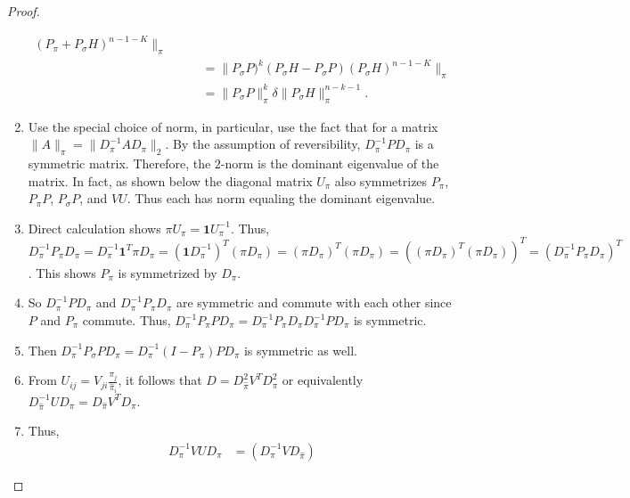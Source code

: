 \documentclass[12pt]{article}
\begin{document}
\begin{proof}
\begin{enumerate}
\begin{align*}
                (P_{\pi}+P_{\sigma}H)^{n-1-K}\|_{\pi} \\
                & \qquad = \|P_{\sigma}P)^k(P_{\sigma}H-P_{\sigma}P) (P_
                {\sigma}H)^{n-1-K}\|_{\pi} \\
                & \qquad = \| P_{\sigma} P \|_{\pi}^k \delta \|P_{\sigma}H\|_
                {\pi}^{n-k-1}.
            \end{align*}
        \item
            Use the special choice of norm, in particular, use the fact
            that for a matrix \( \| A \|_{\pi} = \| D_{\pi}^{-1} A D_{\pi}
            \|_{2} \).  By the assumption of reversibility, \( D_{\pi}^{-1}
            P D_{\pi} \) is a symmetric matrix.  Therefore, the \( 2 \)-norm
            is the dominant eigenvalue of the matrix.  In fact, as shown
            below the diagonal matrix \( U_{\pi} \) also symmetrizes \(
            P_{\pi} \), \( P_{\pi}P \), \( P_{\sigma}P \), and \( VU \).
            Thus each has norm equaling the dominant eigenvalue.
        \item
            Direct calculation shows \( \pi U_{\pi} = \mathbf{1} U_{\pi}^
            {-1} \).  Thus, \( D_{\pi}^{-1} P_{\pi} D_{\pi} = D_{\pi}^{-1}
            \mathbf{1}^{T} \pi D_{\pi} = (\mathbf{1} D_{\pi}^{-1})^T(\pi
            D_{\pi}) = (\pi D_{\pi})^T(\pi D_{\pi}) = ( (\pi D_{\pi})^T(\pi
            D_{\pi}))^T = (D_{\pi}^{-1} P_{\pi} D_{\pi})^T \).  This
            shows \( P_{\pi} \) is symmetrized by \( D_{\pi} \).
        \item
            So \( D_{\pi}^{-1} P D_{\pi} \) and \( D_{\pi}^{-1} P_{\pi}
            D_{\pi} \) are symmetric and commute with each other since \(
            P \) and \( P_{\pi} \) commute.  Thus, \( D_{\pi}^{-1} P_{\pi}
            P D_{\pi} = D_{\pi}^{-1} P_{\pi} D_{\pi} D_{\pi}^{-1} P D_{\pi}
            \) is symmetric.
        \item
            Then \( D_{\pi}^{-1} P_{\sigma} P D_{\pi} = D_{\pi}^{-1} (I-P_
            {\pi}) P D_{\pi} \) is symmetric as well.
        \item
            From \( U_{ij} = V_{ji} \frac{\pi_j}{\hat{\pi}_{i}} \), it
            follows that \( D = D_{\hat{\pi}}^2 V^T D_{\pi}^2 \) or
            equivalently \( D_{\hat{\pi}}^{-1} U D_{\pi} = D_{\hat{\pi}}
            V^T D_{\pi} \).
        \item
            Thus,
            \begin{align*}
                D_{\pi}^{-1} VU D_{\pi} &= (D_{\pi}^{-1} V D_{\hat{\pi}})

\end{align*}
\end{enumerate}
\end{proof}
\end{document}
